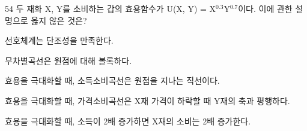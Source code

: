 \begin{question}{54}
두 재화 X, Y를 소비하는 갑의 효용함수가 U(X, Y) = X$^{0.3}$Y$^{0.7}$이다. 이에 관한 설명으로 옳지 않은 것은?
\begin{choices}
  \item 선호체계는 단조성을 만족한다.
  \item 무차별곡선은 원점에 대해 볼록하다.
  \item 효용을 극대화할 때, 소득소비곡선은 원점을 지나는 직선이다.
  \item 효용을 극대화할 때, 가격소비곡선은 X재 가격이 하락할 때 Y재의 축과 평행하다.
  \item 효용을 극대화할 때, 소득이 2배 증가하면 X재의 소비는 2배 증가한다.
\end{choices}
\end{question}

